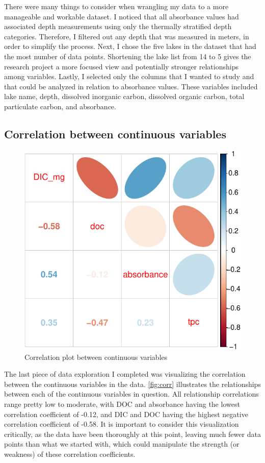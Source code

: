 \documentclass[12pt,]{article}
\begin{document}
There were many things to consider when wrangling my data to a more
manageable and workable dataset. I noticed that all absorbance values
had associated depth measurements using only the thermally stratified
depth categories. Therefore, I filtered out any depth that was measured
in meters, in order to simplify the process. Next, I chose the five
lakes in the dataset that had the most number of data points. Shortening
the lake list from 14 to 5 gives the research project a more focused
view and potentially stronger relationships among variables. Lastly, I
selected only the columns that I wanted to study and that could be
analyzed in relation to absorbance values. These variables included lake
name, depth, dissolved inorganic carbon, dissolved organic carbon, total
particulate carbon, and absorbance.

\subsection{Correlation between continuous
variables}\label{correlation-between-continuous-variables}

\begin{figure}
\centering
\includegraphics{Bash_ENV872_Project_files/figure-latex/corr-1.pdf}
\caption{\label{fig:corr} Correlation plot between continuous variables}
\end{figure}

The last piece of data exploration I completed was visualizing the
correlation between the continuous variables in the data.
\autoref{fig:corr} illustrates the relationships between each of the
continuous variables in question. All relationship correlations range
pretty low to moderate, with DOC and absorbance having the lowest
correlation coefficient of -0.12, and DIC and DOC having the highest
negative correlation coefficient of -0.58. It is important to consider
this visualization critically, as the data have been thoroughly at this
point, leaving much fewer data points than what we started with, which
could manipulate the strength (or weakness) of these correlation
coefficients.
\end{document}
